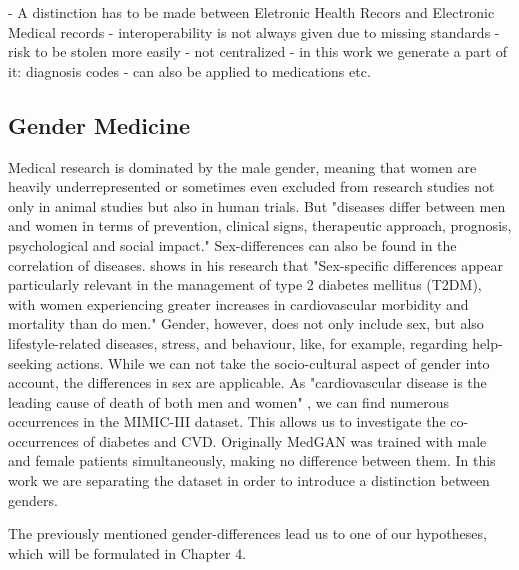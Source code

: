 \documentclass[11pt, a4paper]{book}
\begin{document}
- A distinction has to be made between Eletronic Health Recors and Electronic Medical records
- interoperability is not always given due to missing standards
- risk to be stolen more easily
- not centralized 
- in this work we generate a part of it: diagnosis codes
- can also be applied to medications etc. 

\subsection{Gender Medicine}
Medical research is dominated by the male gender, meaning that women are heavily underrepresented or sometimes even excluded from research studies not only in animal studies but also in human trials. \cite{baggio2013gender} 
But "diseases  differ  between  men  and  women  in  terms  of  prevention,  clinical  signs,  therapeutic  approach,  prognosis,  psychological  and  social  impact." \cite{baggio2013gender}
Sex-differences can also be found in the correlation of diseases. \cite{kautzky2010sex} shows in his research that "Sex-specific differences appear particularly relevant in the management of type 2 diabetes mellitus (T2DM), with women experiencing greater increases in cardiovascular morbidity and mortality than do men." \cite{kautzky2010sex}
Gender, however, does not only include sex, but also lifestyle-related diseases, stress, and behaviour, like, for example, regarding help-seeking actions.
While we can not take the socio-cultural aspect of gender into account, the differences in sex are applicable.
As "cardiovascular disease is the leading cause of death of both men and women" \cite{arain2009sex}, we can find numerous occurrences in the MIMIC-III dataset. This allows us to investigate the co-occurrences of diabetes and CVD.
Originally MedGAN was trained with male and female patients simultaneously, making no difference between them. In this work we are separating the dataset in order to introduce a distinction between genders.

The previously mentioned gender-differences lead us to one of our hypotheses, which will be formulated in Chapter 4.
\end{document}
